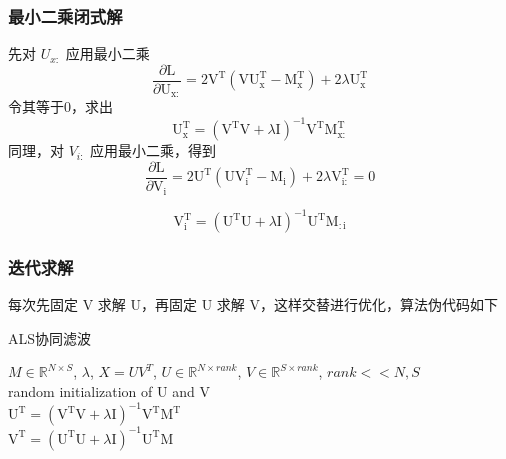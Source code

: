 \documentclass[UTF8,12pt]{ctexart}
\begin{document}
\subsubsection{最小二乘闭式解}
先对 $U_{x:}$ 应用最小二乘
\begin{equation}
\label{equ:gradU}
\frac{\partial \mathrm{L}}{\partial \mathrm{U}_{\mathrm{x:}}}=2 \mathrm{V}^{\mathrm{T}}\left(\mathrm{V} \mathrm{U}_{\mathrm{x}}^{\mathrm{T}}-\mathrm{M}_{\mathrm{x}}^{\mathrm{T}}\right)+2 \lambda \mathrm{U}_{\mathrm{x}}^{\mathrm{T}}
\end{equation}
令其等于0，求出
\begin{equation}
\label{equ:alsU}
\mathrm{U}_{\mathrm{x}}^{\mathrm{T}}=\left(\mathrm{V}^{\mathrm{T}} \mathrm{V}+\lambda \mathrm{I}\right)^{-1} \mathrm{V}^{\mathrm{T}} \mathrm{M}_{\mathrm{x} :}^{\mathrm{T}}
\end{equation}
同理，对 $V_{i:}$ 应用最小二乘，得到
\begin{equation}
\label{equ:gradV}
\frac{\partial \mathrm{L}}{\partial \mathrm{V}_{\mathrm{i}}}=2 \mathrm{U}^{\mathrm{T}}\left(\mathrm{U} \mathrm{V}_{\mathrm{i}}^{\mathrm{T}}-\mathrm{M}_{\mathrm{i}}\right)+2 \lambda \mathrm{V}_{\mathrm{i} :}^{\mathrm{T}}=0
\end{equation}

\begin{equation}
\label{equ:alsV}
\mathrm{V}_{\mathrm{i}}^{\mathrm{T}}=\left(\mathrm{U}^{\mathrm{T}} \mathrm{U}+\lambda \mathrm{I}\right)^{-1} \mathrm{U}^{\mathrm{T}} \mathrm{M}_{ : \mathrm{i}}
\end{equation}

\subsubsection{迭代求解}
每次先固定 V 求解 U，再固定 U 求解 V，这样交替进行优化，算法伪代码如下
\begin{algorithm}[htb]
\caption{ALS协同滤波}
\label{alg:ALS}
\begin{algorithmic}
	\Require
	$M \in \mathbb{R}^{N \times S}$, $\lambda$, 
	\Ensure
	$X = UV^T$, $U \in \mathbb{R}^{N \times rank}$, $V \in \mathbb{R}^{S \times rank}$, $rank << N, S$ \\
		random initialization of U and V
		 \\
		\qquad $\mathrm{U}^{\mathrm{T}}=\left(\mathrm{V}^{\mathrm{T}} \mathrm{V}+\lambda \mathrm{I}\right)^{-1} \mathrm{V}^{\mathrm{T}} \mathrm{M}^{\mathrm{T}}$ \\
		\qquad $\mathrm{V}^{\mathrm{T}}=\left(\mathrm{U}^{\mathrm{T}} \mathrm{U}+\lambda \mathrm{I}\right)^{-1} \mathrm{U}^{\mathrm{T}} \mathrm{M}$
		\EndFor
\end{algorithmic}
\end{algorithm}
\end{document}
